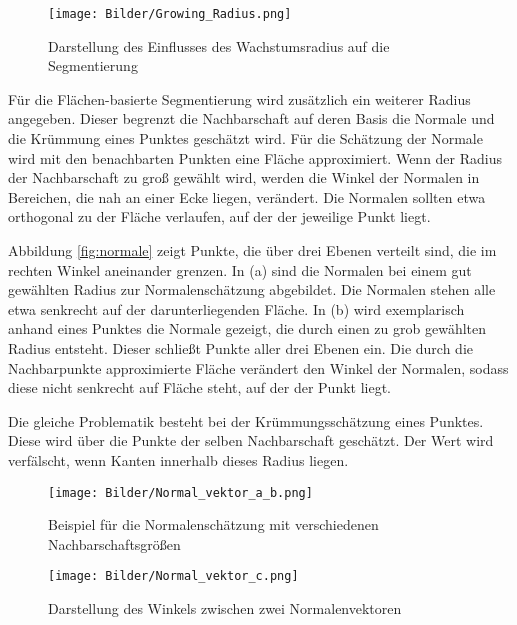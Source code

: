 \begin{figure}
	\centering
	\texttt{[image: Bilder/Growing\_Radius.png]}
	\caption{Darstellung des Einflusses des Wachstumsradius auf die Segmentierung}
	\label{fig:Growing}
\end{figure}

Für die Flächen-basierte Segmentierung wird zusätzlich ein weiterer Radius an\-ge\-ge\-ben. Dieser begrenzt die Nachbarschaft auf deren Basis die Normale und die Krümmung eines Punktes geschätzt wird. Für die Schätzung der Normale wird mit den benachbarten Punkten eine Fläche approximiert. Wenn der Radius der Nachbarschaft zu groß gewählt wird, werden die Winkel der Normalen in Bereichen, die nah an einer Ecke liegen, verändert. Die Normalen sollten etwa orthogonal zu der Fläche verlaufen, auf der der jeweilige Punkt liegt. 

Abbildung \ref{fig:normale} zeigt Punkte, die über drei Ebenen verteilt sind, die im rechten Winkel aneinander grenzen. In (a) sind die Normalen bei einem gut gewählten Radius zur Normalenschätzung abgebildet. Die Normalen stehen alle etwa senkrecht auf der darunterliegenden Fläche. In (b) wird exemplarisch anhand eines Punktes die Normale gezeigt, die durch einen zu grob gewählten Radius entsteht. Dieser schließt Punkte aller drei Ebenen ein. Die durch die Nachbarpunkte approximierte Fläche verändert den Winkel der Normalen, sodass diese nicht senkrecht auf Fläche steht, auf der der Punkt liegt. 

Die gleiche Problematik besteht bei der Krümmungsschätzung eines Punktes. Diese wird über die Punkte der selben Nachbarschaft geschätzt. Der Wert wird verfälscht, wenn Kanten innerhalb dieses Radius liegen. 
 

\begin{figure}[htb]
	\centering
	\begin{minipage}[t]{0.6\linewidth}
		\centering
		\texttt{[image: Bilder/Normal\_vektor\_a\_b.png]}
		\caption{Beispiel für die Normalenschätzung mit verschiedenen Nachbarschaftsgrößen}
		\label{fig:normale}
	\end{minipage}
	\hfill
	\begin {minipage}[t]{0.3\linewidth}
		\centering
		\texttt{[image: Bilder/Normal\_vektor\_c.png]}
		\caption{Darstellung des Winkels zwischen zwei Normalenvektoren}
		\label{fig:winkel_normale}
	\end{minipage}
\end{figure}

